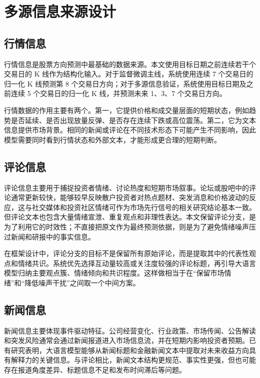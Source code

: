 \section{多源信息来源设计}

\subsection{行情信息}

行情信息是股票方向预测中最基础的数据来源。本文使用目标日期之前连续若干个交易日的 K 线作为结构化输入。对于监督微调主线，系统使用连续 7 个交易日的归一化 K 线预测第 8 个交易日方向；对于多源信息验证，系统使用目标日期及之前连续 5 个交易日的归一化 K 线，并预测未来 1、3、7 个交易日方向。

行情数据的作用主要有两个。第一，它提供价格和成交量层面的短期状态，例如趋势是否延续、是否出现放量反弹、是否存在连续下跌或高位震荡。第二，它为文本信息提供市场背景。相同的新闻或评论在不同技术形态下可能产生不同影响，因此模型需要同时看到行情状态和外部文本，才能形成更合理的短期判断。

\subsection{评论信息}

评论信息主要用于捕捉投资者情绪、讨论热度和短期市场叙事。论坛或股吧中的评论通常更新较快，能够较早反映散户投资者对热点题材、突发消息和价格波动的反应，这与社交媒体和投资社区情绪可作为市场先行信号的相关研究结论基本一致\cite{bollen2011twitter,zhang2025gnn,zhou2025expertopinion}。但评论文本也包含大量情绪宣泄、重复观点和非理性表达。本文保留评论分支，是为了利用它的时效性；不直接把原文作为最终预测依据，则是为了避免情绪噪声压过新闻和研报中的事实信息。

在框架设计中，评论分支的目标不是保留所有原始评论，而是提取其中的代表性观点和情绪共识。系统优先选择互动量较高或关注度较强的评论标题，再引导大语言模型归纳主要观点簇、情绪倾向和共识程度。这样做相当于在“保留市场情绪”和“降低噪声干扰”之间取一个中间方案。

\subsection{新闻信息}

新闻信息主要体现事件驱动特征。公司经营变化、行业政策、市场传闻、公告解读和突发风险通常会通过新闻报道进入市场信息流，并在短期内影响投资者预期。已有研究表明，大语言模型能够从新闻标题和金融新闻文本中提取对未来收益方向具有解释力的关键信息\cite{lopezlira2023chatgptstock,elahi2024financialnewsllm}。与评论相比，新闻文本结构更规范、事实性更强，但也可能存在报道角度差异、标题信息不足和发布时间滞后等问题。

